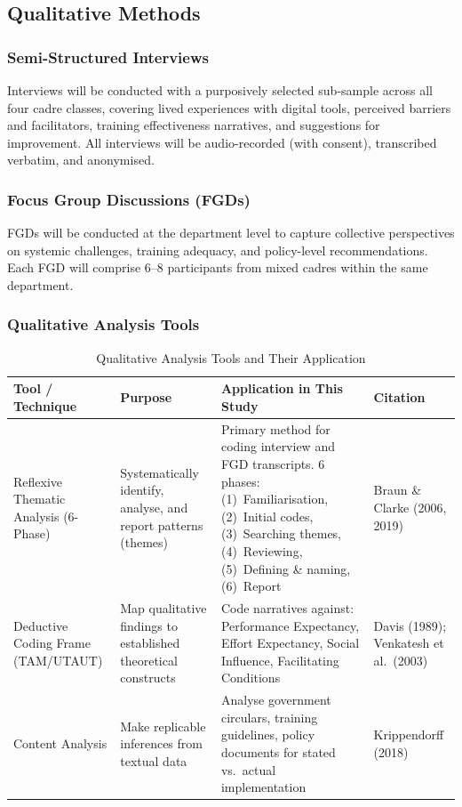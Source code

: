 \documentclass[12pt,a4paper]{article}
\begin{document}
\subsection{Qualitative Methods}

\subsubsection{Semi-Structured Interviews}

Interviews will be conducted with a purposively selected sub-sample across all four cadre classes, covering lived experiences with digital tools, perceived barriers and facilitators, training effectiveness narratives, and suggestions for improvement. All interviews will be audio-recorded (with consent), transcribed verbatim, and anonymised.

\subsubsection{Focus Group Discussions (FGDs)}

FGDs will be conducted at the department level to capture collective perspectives on systemic challenges, training adequacy, and policy-level recommendations. Each FGD will comprise 6--8 participants from mixed cadres within the same department.

\subsubsection{Qualitative Analysis Tools}

\begin{table}[H]
\centering
\caption{Qualitative Analysis Tools and Their Application}
\small
\begin{tabularx}{\textwidth}{L{3.2cm} L{2.8cm} X L{2.8cm}}
\toprule
\textbf{Tool / Technique} & \textbf{Purpose} & \textbf{Application in This Study} & \textbf{Citation} \\
\midrule
Reflexive Thematic Analysis (6-Phase) & Systematically identify, analyse, and report patterns (themes) & Primary method for coding interview and FGD transcripts. 6 phases: (1)~Familiarisation, (2)~Initial codes, (3)~Searching themes, (4)~Reviewing, (5)~Defining \& naming, (6)~Report & Braun \& Clarke (2006, 2019) \\[6pt]
Deductive Coding Frame (TAM/UTAUT) & Map qualitative findings to established theoretical constructs & Code narratives against: Performance Expectancy, Effort Expectancy, Social Influence, Facilitating Conditions & Davis (1989); Venkatesh et al.\ (2003) \\[6pt]
Content Analysis & Make replicable inferences from textual data & Analyse government circulars, training guidelines, policy documents for stated vs.\ actual implementation & Krippendorff (2018) \\
\bottomrule
\end{tabularx}
\end{table}
\end{document}
